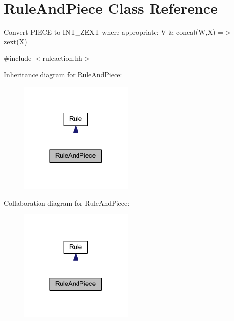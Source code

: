 \hypertarget{class_rule_and_piece}{}\section{Rule\+And\+Piece Class Reference}
\label{class_rule_and_piece}


Convert P\+I\+E\+CE to I\+N\+T\+\_\+\+Z\+E\+XT where appropriate\+: {\ttfamily V \& concat(\+W,\+X) =$>$ zext(\+X)}  




{\ttfamily \#include $<$ruleaction.\+hh$>$}



Inheritance diagram for Rule\+And\+Piece\+:
\nopagebreak
\begin{figure}[H]
\begin{center}
\leavevmode
\includegraphics[width=158pt]{class_rule_and_piece__inherit__graph}
\end{center}
\end{figure}


Collaboration diagram for Rule\+And\+Piece\+:
\nopagebreak
\begin{figure}[H]
\begin{center}
\leavevmode
\includegraphics[width=158pt]{class_rule_and_piece__coll__graph}
\end{center}
\end{figure}
